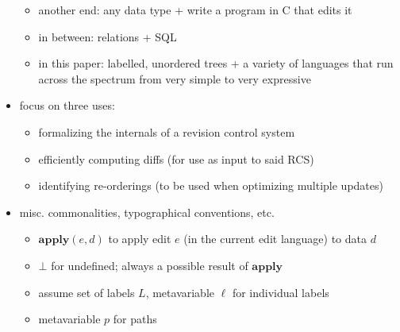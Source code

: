 \documentclass{article}
\newcommand{\undefined}{\ensuremath{\bot}\xspace}
\newcommand{\apply}{\ensuremath{\mathbf{apply}}\xspace}
\begin{document}
\begin{itemize}
\begin{itemize}
            \item another end: any data type + write a program in C that
                edits it
            \item in between: relations + SQL
            \item in this paper: labelled, unordered trees + a variety of
                languages that run across the spectrum from very simple to
                very expressive
        \end{itemize}
    \item focus on three uses:
        \begin{itemize}
            \item formalizing the internals of a revision control system
            \item efficiently computing diffs (for use as input to said RCS)
            \item identifying re-orderings (to be used when optimizing
                multiple updates)
        \end{itemize}
    \item misc. commonalities, typographical conventions, etc.
        \begin{itemize}
            \item $\apply(e,d)$ to apply edit $e$ (in the current edit
                language) to data $d$
            \item \undefined for undefined; always a possible result of
                $\apply$
            \item assume set of labels $L$, metavariable $\ell$ for
                individual labels
            \item metavariable $p$ for paths
        \end{itemize}
\end{itemize}
\end{document}
